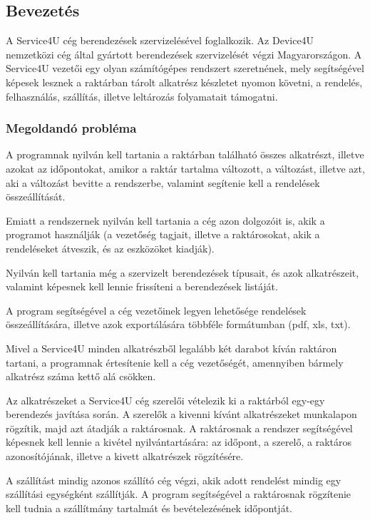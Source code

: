 \documentclass[12pt]{article}\usepackage[left=20mm,right=20mm,top=15mm,bottom=20mm]{geometry}
\begin{document}
\subsection{Bevezetés}
A Service4U cég berendezések szervizelésével foglalkozik. Az Device4U nemzetközi cég által
gyártott berendezések szervizelését végzi Magyarországon.
A Service4U vezetői egy olyan számítógépes rendszert szeretnének, mely segítségével képesek
lesznek a raktárban tárolt alkatrész készletet nyomon követni, a rendelés, felhasználás, szállítás, illetve
leltározás folyamatait támogatni.

\subsubsection{Megoldandó probléma}
A programnak nyilván kell tartania a raktárban található összes alkatrészt, illetve azokat az időpontokat, amikor a raktár tartalma változott, a változást, illetve azt, aki a változást bevitte a rendszerbe, valamint segítenie kell a rendelések összeállítását.

Emiatt a rendszernek nyilván kell tartania a cég azon dolgozóit is, akik a programot használják (a vezetőség tagjait, illetve a raktárosokat, akik a rendeléseket átveszik, és az eszközöket kiadják).

Nyilván kell tartania még a szervizelt berendezések típusait, és azok alkatrészeit, valamint képesnek kell lennie frissíteni a berendezések listáját.

A program segítségével a cég vezetőinek legyen lehetősége rendelések összeállítására, illetve azok exportálására többféle formátumban (pdf, xls, txt).
 
Mivel a Service4U minden alkatrészből legalább két darabot kíván raktáron tartani, a programnak értesítenie kell a cég vezetőségét, amennyiben bármely alkatrész száma kettő alá csökken.

Az alkatrészeket a Service4U cég szerelői vételezik ki a raktárból egy-egy berendezés javítása
során. 
A szerelők a kivenni kívánt alkatrészeket munkalapon rögzítik, majd azt átadják a raktárosnak. 
A raktárosnak a rendszer segítségével képesnek kell lennie a kivétel nyilvántartására: az időpont, a szerelő, a raktáros azonosítójának, illetve a kivett alkatrészek rögzítésére.

A szállítást mindig azonos szállító cég végzi, akik adott rendelést mindig egy szállítási egységként szállítják.
A program segítségével a raktárosnak rögzítenie kell tudnia a szállítmány tartalmát és bevételezésének időpontját.
\end{document}
